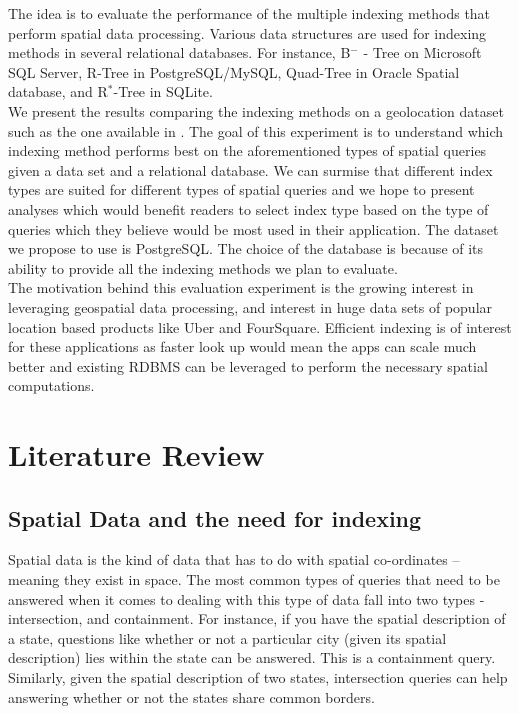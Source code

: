 \documentclass{sig-alternate-05-2015}
\begin{document}
The idea is to evaluate the performance of the multiple indexing methods that perform spatial data processing. Various data structures are used for indexing methods in several relational databases. For instance, B$^{-}$ - Tree on Microsoft SQL Server, R-Tree in PostgreSQL/MySQL, Quad-Tree in Oracle Spatial database, and R$^{*}$-Tree in SQLite.\\

We present the results comparing the indexing methods on a geolocation dataset such as the one available in \cite{sarwat:data}. The goal of this experiment is to understand which indexing method performs best on the aforementioned types of spatial queries given a data set and a relational database. We can surmise that different index types are suited for different types of spatial queries and we hope to present analyses which would benefit readers to select index type based on the type of queries which they believe would be most used in their application. The dataset we propose to use is PostgreSQL. The choice of the database is because of its ability to provide all the indexing methods we plan to evaluate.\\

The motivation behind this evaluation experiment is the growing interest in leveraging geospatial data processing, and interest in huge data sets of popular location based products like Uber and FourSquare. Efficient indexing is of interest for these applications as faster look up would mean the apps can scale much better and existing RDBMS can be leveraged to perform the necessary spatial computations. \\

\section{Literature Review}

\subsection{Spatial Data and the need for indexing}
Spatial data is the kind of data that has to do with spatial co-ordinates -- meaning they exist in space. The most common types of queries that need to be answered when it comes to dealing with this type of data fall into two types - intersection, and containment. For instance, if you have the spatial description of a state, questions like whether or not a particular city (given its spatial description) lies within the state can be answered. This is a containment query. Similarly, given the spatial description of two states, intersection queries can help answering whether or not the states share common borders. 
\end{document}
